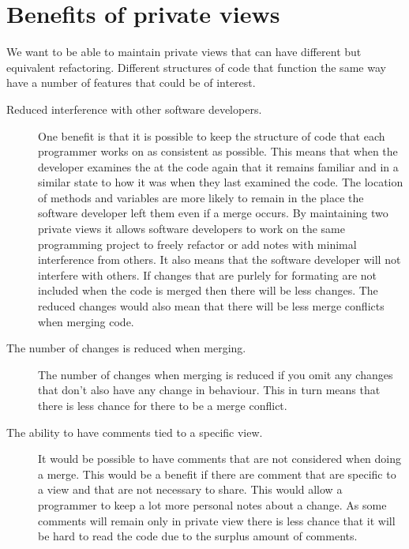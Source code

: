 \section{Benefits of private views}
We want to be able to maintain private views that can have different but equivalent refactoring. Different structures of code that function the same way have a number of features that could be of interest.

\begin{description}

\item [Reduced interference with other software developers.]   
One benefit is that it is possible to keep the structure of code that each programmer works on as consistent as possible.  This means that when the developer examines the at the code again that it remains familiar and in a similar state to how it was when they last examined the code. The location of methods and variables are more likely to remain in the place the software developer left them even if a merge occurs.
By maintaining two private views it allows software developers to work on the same programming project to freely refactor or add notes with minimal interference from others.
It also means that the software developer will not interfere with others.
If changes that are purlely for formating are not included when the code is merged then there will be less changes.
The reduced changes would also mean that there will be less merge conflicts when merging code.
  
\item [The number of changes is reduced when merging.] 
The number of changes when merging is reduced if you omit any changes that don't also have any change in behaviour.  This in turn means that there is less chance for there to be a merge conflict.
  
\item [The ability to have comments tied to a specific view.] 
It would be possible to have comments that are not considered when doing a merge. This would be a benefit if there are comment that are specific to a view and that are not necessary to share.  This would allow a programmer to keep a lot more personal notes about a change.  As some comments will remain only in private view there is less chance that it will be hard to read the code due to the surplus amount of comments. 

\end{description}


